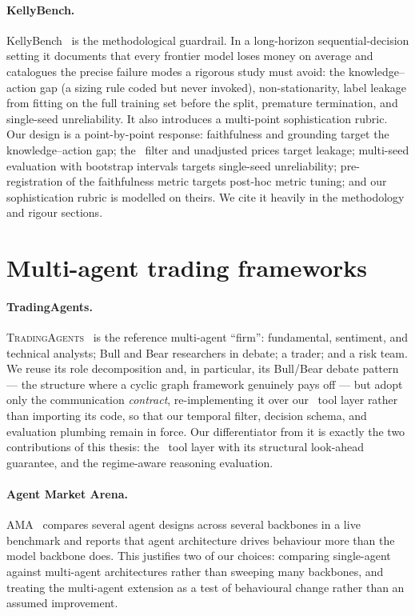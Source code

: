 \paragraph{KellyBench.} KellyBench~\cite{kellybench2026} is the methodological guardrail. In a
long-horizon sequential-decision setting it documents that every frontier model loses money
on average and catalogues the precise failure modes a rigorous study must avoid: the
knowledge--action gap (a sizing rule coded but never invoked), non-stationarity, label
leakage from fitting on the full training set before the split, premature termination, and
single-seed unreliability. It also introduces a multi-point sophistication rubric. Our design
is a point-by-point response: faithfulness and grounding target the knowledge--action gap;
the \tnow\ filter and unadjusted prices target leakage; multi-seed evaluation with bootstrap
intervals targets single-seed unreliability; pre-registration of the faithfulness metric
targets post-hoc metric tuning; and our sophistication rubric is modelled on theirs. We cite
it heavily in the methodology and rigour sections.

\section{Multi-agent trading frameworks}
\label{sec:rwagents}

\paragraph{TradingAgents.} \textsc{TradingAgents}~\cite{tradingagents2024} is the reference
multi-agent ``firm'': fundamental, sentiment, and technical analysts; Bull and Bear
researchers in debate; a trader; and a risk team. We reuse its role decomposition and, in
particular, its Bull/Bear debate pattern --- the structure where a cyclic graph framework
genuinely pays off --- but adopt only the communication \emph{contract}, re-implementing it
over our \mcp\ tool layer rather than importing its code, so that our temporal filter, decision
schema, and evaluation plumbing remain in force. Our differentiator from it is exactly the two
contributions of this thesis: the \mcp\ tool layer with its structural look-ahead guarantee,
and the regime-aware reasoning evaluation.

\paragraph{Agent Market Arena.} AMA~\cite{ama2025} compares several agent designs across
several backbones in a live benchmark and reports that agent architecture drives behaviour
more than the model backbone does. This justifies two of our choices: comparing single-agent
against multi-agent architectures rather than sweeping many backbones, and treating the
multi-agent extension as a test of behavioural change rather than an assumed improvement.

